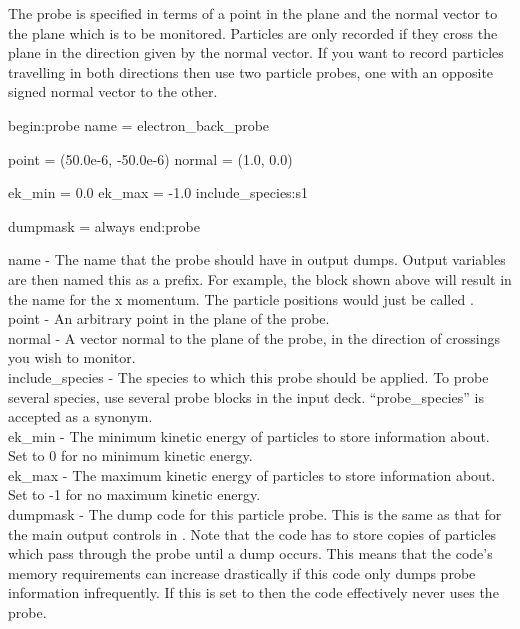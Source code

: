 The probe is specified in terms of a point in the plane and the normal
vector to the plane which is to be monitored. Particles are only recorded
if they cross the plane in the direction given by the normal vector.
If you want to record particles travelling in both directions then use two
particle probes, one with an opposite signed normal vector to the other.
{\samepage
\begin{boxverbatim}
begin:probe
   name = electron_back_probe

   point = (50.0e-6, -50.0e-6)
   normal = (1.0, 0.0)

   ek_min = 0.0
   ek_max = -1.0
   include_species:s1

   dumpmask = always
end:probe
\end{boxverbatim}
}

{\emphtext name} - The name that the probe should have in output dumps. Output
  variables are then named this as a prefix. For example, the block shown above
  will result in the name  for
  the x momentum. The particle positions would just be called
  .\\

{\emphtext point} - An arbitrary point in the plane of the probe.\\

{\emphtext normal} - A vector normal to the plane of the probe, in the direction
  of crossings you wish to monitor.\\

{\emphtext include\_species} - The species to which this probe should be
  applied. To probe several species, use several probe blocks in the input
  deck. ``probe\_species'' is accepted as a synonym.\\

{\emphtext ek\_min} - The minimum kinetic energy of particles to store
  information about. Set to 0 for no minimum kinetic energy.\\

{\emphtext ek\_max} - The maximum kinetic energy of particles to store
  information about. Set to -1 for no maximum kinetic energy.\\

{\emphtext dumpmask} - The dump code for this particle probe. This is the same
  as that for the main output controls in . Note that
  the code has to store copies of particles which pass through the probe until
  a dump occurs. This means that the code's memory requirements can increase
  drastically if this code only dumps probe information infrequently. If this
  is set to  then the code effectively never uses the probe.\\


